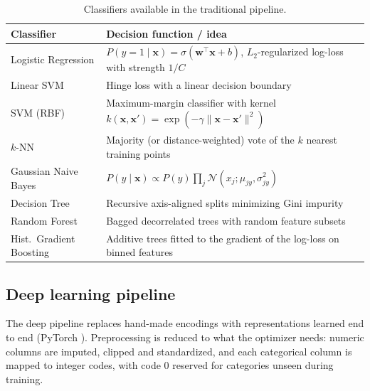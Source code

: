 \begin{table}[H]
  \centering
  \small
  \begin{tabularx}{\linewidth}{lX}
    \toprule
    \textbf{Classifier} & \textbf{Decision function / idea} \\
    \midrule
    Logistic Regression & $P(y=1 \mid \bm{x}) = \sigma(\bm{w}^\top \bm{x} + b)$, $L_2$-regularized log-loss with strength $1/C$ \\
    Linear SVM & Hinge loss with a linear decision boundary \\
    SVM (RBF) & Maximum-margin classifier with kernel $k(\bm{x}, \bm{x}') = \exp(-\gamma \lVert \bm{x} - \bm{x}' \rVert^2)$ \cite{cortes1995} \\
    $k$-NN & Majority (or distance-weighted) vote of the $k$ nearest training points \\
    Gaussian Naive Bayes & $P(y \mid \bm{x}) \propto P(y) \prod_j \mathcal{N}(x_j; \mu_{jy}, \sigma^2_{jy})$ \\
    Decision Tree & Recursive axis-aligned splits minimizing Gini impurity \\
    Random Forest & Bagged decorrelated trees with random feature subsets \cite{breiman2001} \\
    Hist.\ Gradient Boosting & Additive trees fitted to the gradient of the log-loss on binned features \cite{friedman2001gbm,lightgbm} \\
    \bottomrule
  \end{tabularx}
  \caption{Classifiers available in the traditional pipeline.}
  \label{tab:classifiers}
\end{table}

\subsection{Deep learning pipeline}
\label{subsec:dl}

The deep pipeline replaces hand-made encodings with representations learned end to end (PyTorch \cite{pytorch}).
Preprocessing is reduced to what the optimizer needs: numeric columns are imputed, clipped and standardized, and each categorical column is mapped to integer codes, with code 0 reserved for categories unseen during training.

